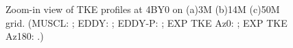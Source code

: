 \begin{figure}[t]
     \caption{Zoom-in view of TKE profiles at 4BY0 on (a)3M (b)14M (c)50M grid. (MUSCL: \mline; EDDY: \eline; EDDY-P: \epline; EXP TKE Az0: \bluediam; EXP TKE Az180: \reddiam.)}
     \label{ztke} 
\end{figure}
